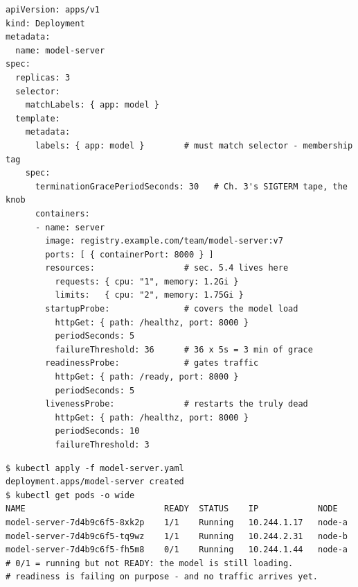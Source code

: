 \begin{terminalbox}
\begin{Verbatim}[breaklines=true,breakanywhere=true,fontsize=\small,formatcom=\color{tbbtermfg},codes=\tbbcodeactive]
apiVersion: apps/v1
kind: Deployment
metadata:
  name: model-server
spec:
  replicas: 3
  selector:
    matchLabels: { app: model }
  template:
    metadata:
      labels: { app: model }        # must match selector - membership tag
    spec:
      terminationGracePeriodSeconds: 30   # Ch. 3's SIGTERM tape, the knob
      containers:
      - name: server
        image: registry.example.com/team/model-server:v7
        ports: [ { containerPort: 8000 } ]
        resources:                  # sec. 5.4 lives here
          requests: { cpu: "1", memory: 1.2Gi }
          limits:   { cpu: "2", memory: 1.75Gi }
        startupProbe:               # covers the model load
          httpGet: { path: /healthz, port: 8000 }
          periodSeconds: 5
          failureThreshold: 36      # 36 x 5s = 3 min of grace
        readinessProbe:             # gates traffic
          httpGet: { path: /ready, port: 8000 }
          periodSeconds: 5
        livenessProbe:              # restarts the truly dead
          httpGet: { path: /healthz, port: 8000 }
          periodSeconds: 10
          failureThreshold: 3
\end{Verbatim}
\end{terminalbox}

\begin{terminalbox}
\begin{Verbatim}[breaklines=true,breakanywhere=true,fontsize=\small,formatcom=\color{tbbtermfg},codes=\tbbcodeactive]
$ kubectl apply -f model-server.yaml
deployment.apps/model-server created
$ kubectl get pods -o wide
NAME                            READY  STATUS    IP            NODE
model-server-7d4b9c6f5-8xk2p    1/1    Running   10.244.1.17   node-a
model-server-7d4b9c6f5-tq9wz    1/1    Running   10.244.2.31   node-b
model-server-7d4b9c6f5-fh5m8    0/1    Running   10.244.1.44   node-a
# 0/1 = running but not READY: the model is still loading.
# readiness is failing on purpose - and no traffic arrives yet.
\end{Verbatim}
\end{terminalbox}

